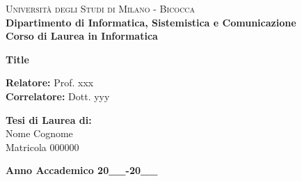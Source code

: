 

    
\begin{titlepage}
    
    \noindent
    \begin{minipage}[t]{0.19\textwidth}
    \end{minipage}
    \hspace{2mm}
    \begin{minipage}[t]{0.70\textwidth}
    {
            {\textsc{Università degli Studi di Milano - Bicocca}} \\
            \textbf{Dipartimento di Informatica, Sistemistica e Comunicazione} \\
            \textbf{Corso di Laurea in Informatica} \\
            \par
    }
    \end{minipage}
    
\vspace{40mm}
    
\begin{center}
        {\LARGE{
                \textbf{Title}
                \par
        }}
    \end{center}
    
    \vspace{50mm}

    \noindent
    {\large \textbf{Relatore:} Prof. xxx } \\

    \noindent
    {\large \textbf{Correlatore:} Dott. yyy}
    
    \vspace{15mm}

    \begin{flushright}
        {\large \textbf{Tesi di Laurea di:}} \\
        \large{Nome Cognome} \\
        \large{Matricola 000000} 
    \end{flushright}
    
    \vspace{20mm}
    \begin{center}
        {\large{\bf Anno Accademico 20\_\_-20\_\_}}
    \end{center}

    
\end{titlepage}

